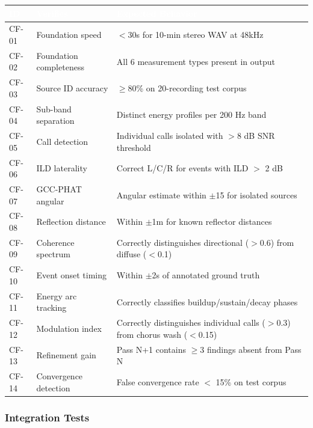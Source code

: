 \documentclass[11pt,letterpaper]{article}
\newcommand{\tableheader}[1]{\textbf{\sffamily\textcolor{white}{#1}}}
\begin{document}
\begin{center}
\begin{tabularx}{\textwidth}{C{1.2cm}L{4cm}X}
\toprule
{}
\tableheader{ID} & \tableheader{Verifies} & \tableheader{Expected Behavior} \\
\midrule
CF-01 & Foundation speed & $<$30s for 10-min stereo WAV at 48kHz \\
CF-02 & Foundation completeness & All 6 measurement types present in output \\
CF-03 & Source ID accuracy & $\geq$80\% on 20-recording test corpus \\
CF-04 & Sub-band separation & Distinct energy profiles per 200 Hz band \\
CF-05 & Call detection & Individual calls isolated with $>$8 dB SNR threshold \\
CF-06 & ILD laterality & Correct L/C/R for events with ILD $>$ 2 dB \\
CF-07 & GCC-PHAT angular & Angular estimate within $\pm$15\textdegree{} for isolated sources \\
CF-08 & Reflection distance & Within $\pm$1m for known reflector distances \\
CF-09 & Coherence spectrum & Correctly distinguishes directional ($>$0.6) from diffuse ($<$0.1) \\
CF-10 & Event onset timing & Within $\pm$2s of annotated ground truth \\
CF-11 & Energy arc tracking & Correctly classifies buildup/sustain/decay phases \\
CF-12 & Modulation index & Correctly distinguishes individual calls ($>$0.3) from chorus wash ($<$0.15) \\
CF-13 & Refinement gain & Pass N+1 contains $\geq$3 findings absent from Pass N \\
CF-14 & Convergence detection & False convergence rate $<$ 15\% on test corpus \\
\bottomrule
\end{tabularx}
\end{center}

\subsubsection{Integration Tests}
\end{document}
